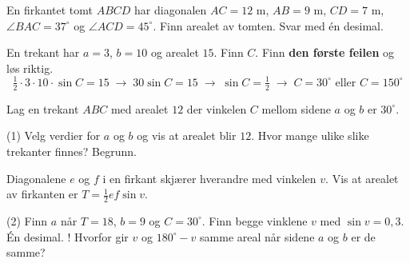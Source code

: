 En firkantet tomt $ABCD$ har diagonalen $AC = 12$ m, $AB = 9$ m, $CD = 7$ m, $\angle BAC = 37^\circ$ og $\angle ACD = 45^\circ$.
Finn arealet av tomten. Svar med én desimal.

En trekant har $a = 3$, $b = 10$ og arealet $15$. Finn $C$. Finn \textbf{den første feilen} og løs riktig.
\[ \tfrac12\cdot 3\cdot 10\cdot\sin C = 15 \;\to\; 30\sin C = 15 \;\to\; \sin C = \tfrac12 \;\to\; C = 30^\circ \text{ eller } C = 150^\circ \]


Lag en trekant $ABC$ med arealet $12$ der vinkelen $C$ mellom sidene $a$ og $b$ er $30^\circ$.
\begin{tasks}(1)
  \task Velg verdier for $a$ og $b$ og vis at arealet blir $12$.
  \task Hvor mange ulike slike trekanter finnes? Begrunn.
\end{tasks}

Diagonalene $e$ og $f$ i en firkant skjærer hverandre med vinkelen $v$. Vis at arealet av firkanten er $T = \frac12 ef\sin v$.

\begin{sjekk}
\begin{tasks}(2)
  \task Finn $a$ når $T = 18$, $b = 9$ og $C = 30^\circ$.
  \task Finn begge vinklene $v$ med $\sin v = 0{,}3$. Én desimal.
  \task! Hvorfor gir $v$ og $180^\circ - v$ samme areal når sidene $a$ og $b$ er de samme?
\end{tasks}
\end{sjekk}
